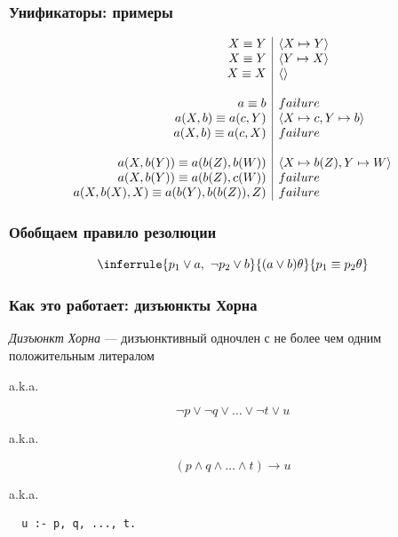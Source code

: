 \documentclass{beamer}
\begin{document}
\begin{frame}[fragile]
  \frametitle{Унификаторы: примеры}
\[
  \begin{array}{r | l}
    X \equiv Y & \langle X \mapsto Y \rangle \\
    X \equiv Y & \langle Y \mapsto X \rangle \\
    X \equiv X & \langle \rangle \\
    & \\
    a \equiv b & failure \\
    a(X, b) \equiv a(c, Y) & \langle X \mapsto c, Y \mapsto b \rangle \\
    a(X, b) \equiv a(c, X) & failure \\
    & \\
    a(X, b(Y)) \equiv a(b(Z), b(W)) & \langle X \mapsto b(Z), Y \mapsto W \rangle \\
    a(X, b(Y)) \equiv a(b(Z), c(W)) & failure \\
    a(X, b(X), X) \equiv a(b(Y), b(b(Z)), Z) & failure
  \end{array}
\]

\end{frame}

\begin{frame}[fragile]
  \frametitle{Обобщаем правило резолюции}
  \[\inferrule{p_1 \vee a, \ \neg p_2 \vee b}{(a \vee b)\theta}{p_1 \equiv p_2 \theta}\]
\end{frame}


\begin{frame}[fragile]
  \frametitle{Как это работает: дизъюнкты Хорна}
\textit{Дизъюнкт Хорна} --- дизъюнктивный одночлен с не более чем одним положительным литералом
\begin{center}
  a.k.a.
\end{center}
\[
  \neg p \vee \neg q \vee \dots \vee \neg t \vee u
\]
\begin{center}
  a.k.a.
\end{center}
\[
  (p \wedge q \wedge \dots \wedge t) \to u
\]
\begin{center}
  a.k.a.
\end{center}
\begin{center}
  \begin{minipage}{0.35\textwidth}
    \begin{verbatim}
  u :- p, q, ..., t.
    \end{verbatim}
  \end{minipage}
\end{center}

\end{frame}
\end{document}
